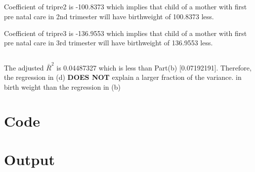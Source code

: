 \documentclass{./solution}
\begin{document}
\begin{solution}
            \subsection{}
            Coefficient of tripre2 is -100.8373 which implies that child of a mother
            with first pre natal care in 2nd trimester will have birthweight of 100.8373 less.

            Coefficient of tripre3 is -136.9553  which implies that child of a mother
            with first pre natal care in 3rd trimester will have birthweight of 136.9553 less.

            \subsection{}
            The adjusted $\bar{R}^{2}$ is  0.04487327 which is less than Part(b) [0.07192191]. Therefore, the regression in (d) \textbf{DOES NOT} explain a larger fraction of the variance.
            in birth weight than the regression in (b)

        \section{Code}

        \section{Output}
    \end{solution}
\end{document}
